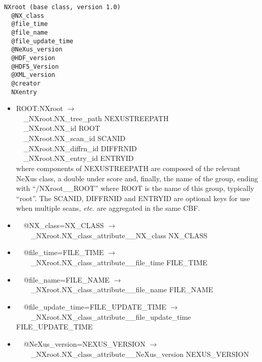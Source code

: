 \documentclass[11pt]{article}
\begin{document}
{{\begin{verbatim}
NXroot (base class, version 1.0)
  @NX_class
  @file_time
  @file_name
  @file_update_time
  @NeXus_version
  @HDF_version
  @HDF5_Version
  @XML_version
  @creator
  NXentry
\end{verbatim}

\begin{itemize}

\item{ROOT:NXroot $\rightarrow$\\
\verb|  |\_NXroot.NX\_tree\_path    NEXUSTREEPATH \\
\verb|  |\_NXroot.NX\_id            ROOT\\
\verb|  |\_NXroot.NX\_scan\_id      SCANID \\
\verb|  |\_NXroot.NX\_diffrn\_id    DIFFRNID \\
\verb|  |\_NXroot.NX\_entry\_id     ENTRYID \\
where components of NEXUSTREEPATH are composed of the
relevant NeXus class, a double under score and, finally, the
name of the group, ending with ``/NXroot\_\_ROOT''
where ROOT is the name of this group, typically ``root''.
The SCANID, DIFFRNID and ENTRYID are optional keys for use
when multiple scans, {\it etc.} are aggregated in the same CBF.}

\item{\verb|  |@NX\_class=NX\_CLASS $\rightarrow$\\
\verb|    |\_NXroot.NX\_class\_attribute\_\_NX\_class NX\_CLASS}

\item{\verb|  |@file\_time=FILE\_TIME $\rightarrow$\\
\verb|    |\_NXroot.NX\_class\_attribute\_\_file\_time FILE\_TIME}

\item{\verb|  |@file\_name=FILE\_NAME $\rightarrow$\\
\verb|    |\_NXroot.NX\_class\_attribute\_\_file\_name FILE\_NAME}

\item{\verb|  |@file\_update\_time=FILE\_UPDATE\_TIME $\rightarrow$\\
\verb|    |\_NXroot.NX\_class\_attribute\_\_file\_update\_time FILE\_UPDATE\_TIME}

\item{\verb|  |@NeXus\_version=NEXUS\_VERSION $\rightarrow$\\
\verb|    |\_NXroot.NX\_class\_attribute\_\_NeXus\_version NEXUS\_VERSION}


\end{itemize}}}
\end{document}
